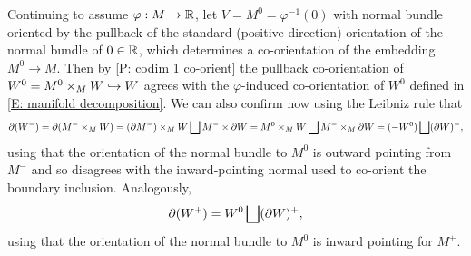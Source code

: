 \begin{example}\label{E: codim 1 pullbacks}
Continuing to assume $\varphi:M\to \mathbb{R}$, let $V=M^0=\varphi^{-1}(0)$ with normal bundle oriented by the pullback of the standard (positive-direction) orientation of the normal bundle of $0\in \mathbb{R}$, which determines a co-orientation of the embedding $M^0\to M$. Then by \cref{P: codim 1 co-orient} the pullback co-orientation of  $W^0=M^0\times_M W\hookrightarrow W$ agrees with the $\varphi$-induced co-orientation of $W^0$ defined in \cref{E: manifold decomposition}. We can also confirm now using the Leibniz rule that $$\partial(W^-)=\partial(M^- \times_M W)=(\partial M^-)\times_M W \bigsqcup M^-\times \partial W=M^0\times_M W \bigsqcup M^-\times_M \partial W=(-W^0) \bigsqcup (\partial W)^-,$$
using that the orientation of the normal bundle to $M^0$ is outward pointing from $M^-$ and so disagrees with the inward-pointing normal used to co-orient the boundary inclusion. Analogously,  $$\partial (W^+)=W^0 \bigsqcup (\partial W)^+,$$
using that the orientation of the normal bundle to $M^0$ is inward pointing for $M^+$.
\end{example}


\begin{comment}
\begin{proof}
Again it is clear that $f\times_Mg=g|_{W^0}$ as maps. Suppose given structural co-orientations. As $f$ is an embedding, we have $K_f=0$, while $V^\perp$ is spanned by $\nu$; note that as $\nu_0$ maps to $\nu$, we write simply $\nu$ in the local decomposition of $TW$. The structural co-orientation of $f$ is $(\beta_{W^\perp}\wedge \beta_I, \beta_{W^\perp}\wedge \beta_I\wedge \beta_\nu)$, which agrees with the assumed co-orientation for $f$. So the co-orientation of the pullback will be the structural orientation or not according to whether the structural co-orientation of $g$ agrees with the given co-orientation of $g$ or not. The structural co-orientation of $g$ is $(\beta_{K_g}\wedge \beta_I\wedge \beta_\nu, \beta_{W^\perp}\wedge \beta_I\wedge \beta_\nu)$, while the structural co-orientation of the pullback is $(\beta_{K_g}\wedge \beta_I, \beta_{W^\perp}\wedge \beta_I\wedge \beta_\nu)$. If the given co-orientation for $g$ agrees with the structural orientation, then the claimed co-orientation for $g|_{W^0}$ is the composition of the structural co-orientation for $g$ with   $(\beta_{W^0},\beta_{W^0}\wedge \beta_{\nu})$. In this last expression we are free to choose any $\beta_{W^0}$ we like, so we can let $\beta_{W^0}=\beta_{K_g}\wedge \beta_I$. Then the claimed composite co-orientation is $(\beta_{K_g}\wedge \beta_I, \beta_{W^\perp}\wedge \beta_I\wedge \beta_\nu)$, which agrees with the pullback co-orientation as claimed. If the given co-orientation of $g$ disagrees with the structural co-orientation, this changes the sign of both the pullback co-orientation and of the representative of the co-orientation of $g$ used in our composite but not the sign of $(\beta_{W^0},\beta_{W^0}\wedge \beta_{\nu})$. So again the pullback co-orientation agrees with the claimed composite.
\end{proof}
\end{comment}

